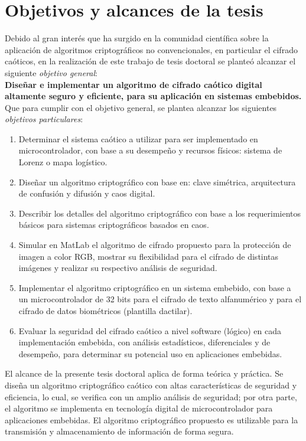 \section{Objetivos y alcances de la tesis}
Debido al gran interés que ha surgido en la comunidad científica sobre la aplicación de algoritmos criptográficos no convencionales, en particular el cifrado caóticos, en la realización de este trabajo de tesis doctoral se planteó alcanzar el siguiente \textit{objetivo general}: \\ 

{\large \textbf{Diseñar e implementar un algoritmo de cifrado caótico digital altamente seguro y eficiente, para su aplicación en sistemas embebidos.}} \\

Que para cumplir con el objetivo general, se plantea alcanzar los siguientes\textit{ objetivos particulares}:

\begin{enumerate}
\item Determinar el sistema caótico a utilizar para ser implementado en microcontrolador, con base a su desempeño y recursos físicos: sistema de Lorenz o mapa logístico.
\item Diseñar un algoritmo criptográfico con base en: clave simétrica, arquitectura de confusión y difusión y caos digital.
\item Describir los detalles del algoritmo criptográfico con base a los requerimientos básicos para sistemas criptográficos basados en caos.   
\item Simular en MatLab el algoritmo de cifrado propuesto para la protección de imagen a color RGB, mostrar su flexibilidad para el cifrado de distintas imágenes y realizar su respectivo análisis de seguridad. 
\item Implementar el algoritmo criptográfico en un sistema embebido, con base a un microcontrolador de 32 bits para el cifrado de texto alfanumérico y para el cifrado de datos biométricos (plantilla dactilar).
\item Evaluar la seguridad del cifrado caótico a nivel software (lógico) en cada implementación embebida, con análisis estadísticos, diferenciales y de desempeño, para determinar su potencial uso en aplicaciones embebidas.
\end{enumerate}

El alcance de la presente tesis doctoral aplica de forma teórica y práctica. Se diseña un algoritmo criptográfico caótico con altas características de seguridad y eficiencia, lo cual, se verifica con un amplio análisis de seguridad; por otra parte, el algoritmo se implementa en tecnología digital de microcontrolador para aplicaciones embebidas. El algoritmo criptográfico propuesto es utilizable para la transmisión y almacenamiento de información de forma segura.  \\

